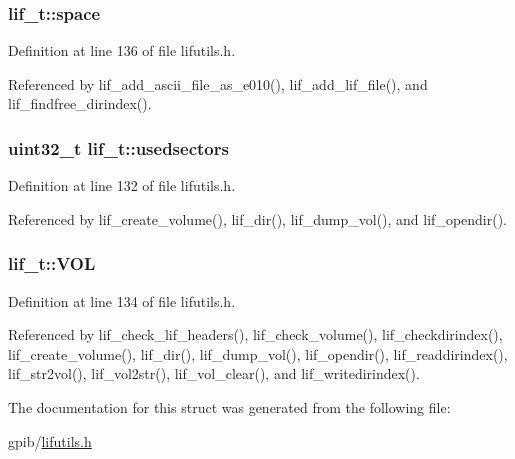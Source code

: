 \subsubsection[{\texorpdfstring{space}{space}}]{ lif\+\_\+t\+::space}\hypertarget{structlif__t_a627408f7370fc24c1b4839f7976b72dd}{}\label{structlif__t_a627408f7370fc24c1b4839f7976b72dd}


Definition at line 136 of file lifutils.\+h.



Referenced by lif\+\_\+add\+\_\+ascii\+\_\+file\+\_\+as\+\_\+e010(), lif\+\_\+add\+\_\+lif\+\_\+file(), and lif\+\_\+findfree\+\_\+dirindex().

\subsubsection[{\texorpdfstring{usedsectors}{usedsectors}}]{\setlength{\rightskip}{0pt plus 5cm}uint32\+\_\+t lif\+\_\+t\+::usedsectors}\hypertarget{structlif__t_ad81767a2f65b997d5abecba130b89814}{}\label{structlif__t_ad81767a2f65b997d5abecba130b89814}


Definition at line 132 of file lifutils.\+h.



Referenced by lif\+\_\+create\+\_\+volume(), lif\+\_\+dir(), lif\+\_\+dump\+\_\+vol(), and lif\+\_\+opendir().

\subsubsection[{\texorpdfstring{V\+OL}{VOL}}]{ lif\+\_\+t\+::\+V\+OL}\hypertarget{structlif__t_ae68126d2b9261ef9a6903a95d5c82cac}{}\label{structlif__t_ae68126d2b9261ef9a6903a95d5c82cac}


Definition at line 134 of file lifutils.\+h.



Referenced by lif\+\_\+check\+\_\+lif\+\_\+headers(), lif\+\_\+check\+\_\+volume(), lif\+\_\+checkdirindex(), lif\+\_\+create\+\_\+volume(), lif\+\_\+dir(), lif\+\_\+dump\+\_\+vol(), lif\+\_\+opendir(), lif\+\_\+readdirindex(), lif\+\_\+str2vol(), lif\+\_\+vol2str(), lif\+\_\+vol\+\_\+clear(), and lif\+\_\+writedirindex().



The documentation for this struct was generated from the following file\+:\begin{DoxyCompactItemize}
\item 
gpib/\hyperlink{lifutils_8h}{lifutils.\+h}\end{DoxyCompactItemize}
